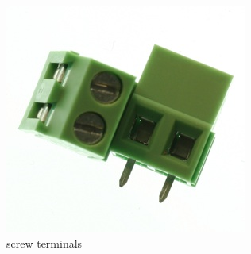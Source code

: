 \begin{figure}[!htb]
     \centering
     \includegraphics[scale=0.3]{img/components/screw_terminals.jpg}
     \caption{screw terminals}
     \label{screw terminals}
\end{figure}


